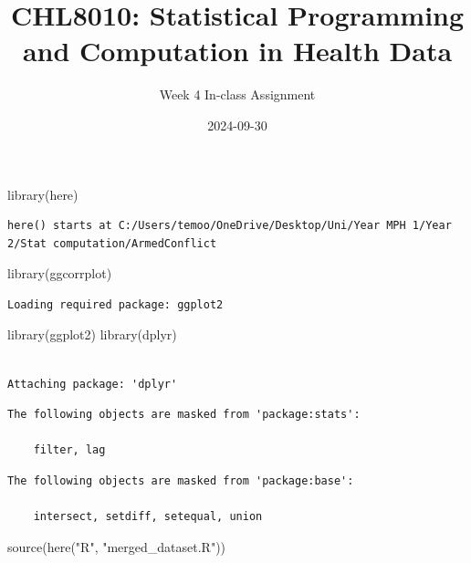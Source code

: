 \documentclass[
  letterpaper,
  DIV=11,
  numbers=noendperiod]{scrartcl}
\title{CHL8010: Statistical Programming and Computation in Health Data}
\author{Week 4 In-class Assignment}
\date{2024-09-30}
\newenvironment{Shaded}{\begin{snugshade}}{\end{snugshade}}
\newcommand{\FunctionTok}[1]{\textcolor[rgb]{0.28,0.35,0.67}{#1}}
\newcommand{\NormalTok}[1]{\textcolor[rgb]{0.00,0.23,0.31}{#1}}
\newcommand{\StringTok}[1]{\textcolor[rgb]{0.13,0.47,0.30}{#1}}
\begin{document}
\maketitle


\begin{Shaded}
\begin{Highlighting}[]
\FunctionTok{library}\NormalTok{(here)}
\end{Highlighting}
\end{Shaded}

\begin{verbatim}
here() starts at C:/Users/temoo/OneDrive/Desktop/Uni/Year MPH 1/Year 2/Stat computation/ArmedConflict
\end{verbatim}

\begin{Shaded}
\begin{Highlighting}[]
\FunctionTok{library}\NormalTok{(ggcorrplot)}
\end{Highlighting}
\end{Shaded}

\begin{verbatim}
Loading required package: ggplot2
\end{verbatim}

\begin{Shaded}
\begin{Highlighting}[]
\FunctionTok{library}\NormalTok{(ggplot2)}
\FunctionTok{library}\NormalTok{(dplyr)}
\end{Highlighting}
\end{Shaded}

\begin{verbatim}

Attaching package: 'dplyr'
\end{verbatim}

\begin{verbatim}
The following objects are masked from 'package:stats':

    filter, lag
\end{verbatim}

\begin{verbatim}
The following objects are masked from 'package:base':

    intersect, setdiff, setequal, union
\end{verbatim}

\begin{Shaded}
\begin{Highlighting}[]
\FunctionTok{source}\NormalTok{(}\FunctionTok{here}\NormalTok{(}\StringTok{"R"}\NormalTok{, }\StringTok{"merged\_dataset.R"}\NormalTok{))}
\end{Highlighting}
\end{Shaded}
\end{document}
